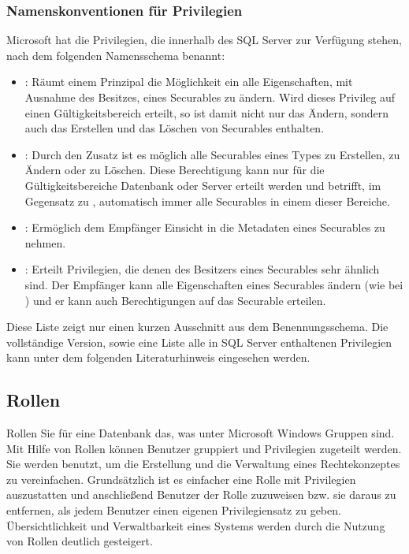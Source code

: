         \subsubsection{Namenskonventionen für Privilegien}
          Microsoft hat die Privilegien, die innerhalb des SQL Server zur
          Verfügung stehen, nach dem folgenden Namensschema benannt:
          \begin{itemize}
            \item {}: Räumt einem Prinzipal die Möglichkeit ein
            alle Eigenschaften, mit Ausnahme des Besitzes, eines Securables zu
            ändern. Wird dieses Privileg auf einen Gültigkeitsbereich erteilt,
            so ist damit nicht nur das Ändern, sondern auch das Erstellen und
            das Löschen von Securables enthalten.
            \item {}: Durch den Zusatz  ist es
            möglich alle Securables eines Types zu Erstellen, zu Ändern oder zu
            Löschen. Diese Berechtigung kann nur für die Gültigkeitsbereiche
            Datenbank oder Server erteilt werden und betrifft, im Gegensatz zu
            , automatisch immer alle Securables in einem dieser
            Bereiche.
            \item {}: Ermöglich dem Empfänger Einsicht
            in die Metadaten eines Securables zu nehmen.
            \item {}: Erteilt Privilegien, die denen des
            Besitzers eines Securables sehr ähnlich sind. Der Empfänger kann alle
            Eigenschaften eines Securables ändern (wie bei ) und
            er kann auch Berechtigungen auf das Securable erteilen.
          \end{itemize}
          Diese Liste zeigt nur einen kurzen Ausschnitt aus dem
          Benennungsschema. Die vollständige Version, sowie eine Liste alle in
          SQL Server enthaltenen Privilegien kann unter dem folgenden
          Literaturhinweis eingesehen werden.
          \begin{literaturinternet}
            \item \cite{ms191291}
          \end{literaturinternet}
      \subsection{Rollen}
        Rollen Sie für eine Datenbank das, was unter Microsoft Windows Gruppen
        sind. Mit Hilfe von Rollen können Benutzer gruppiert und Privilegien
        zugeteilt werden. Sie werden benutzt, um die Erstellung und die
        Verwaltung eines Rechtekonzeptes zu vereinfachen. Grundsätzlich ist es
        einfacher eine Rolle mit Privilegien auszustatten und anschließend
        Benutzer der Rolle zuzuweisen bzw. sie daraus zu entfernen, als jedem
        Benutzer einen eigenen Privilegiensatz zu geben. Übersichtlichkeit
        und Verwaltbarkeit eines Systems werden durch die Nutzung von Rollen
        deutlich gesteigert.
        
